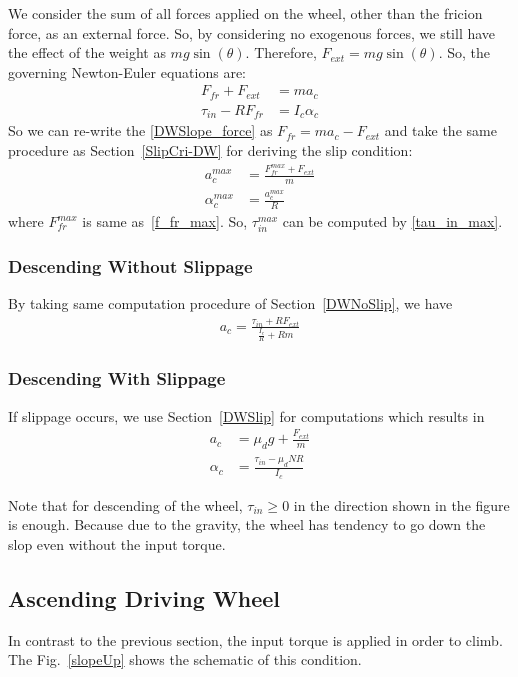 \documentclass[letterpaper, 10pt, conference]{ieeeconf}
\begin{document}
We consider the sum of all forces applied on the wheel, other than the fricion force, as an external force. So, by considering no exogenous forces, we still have the effect of the weight as $mg\sin(\theta)$. Therefore, $F_{ext} = mg\sin(\theta)$. So, the governing Newton-Euler equations are:
\begin{align}
F_{fr} + F_{ext} &= ma_c \label{DWSlope_force} \\
\tau_{in} - RF_{fr} &= I_c \alpha_c \label{DWSlope_torque}
\end{align}
So we can re-write the \eqref{DWSlope_force} as $F_{fr} = ma_c - F_{ext}$ and take the same procedure as Section~\ref{SlipCri-DW} for deriving the slip condition:
\begin{align}
a_c^{max} &= \frac{F_{fr}^{max} + F_{ext}}{m} \\
\alpha_c^{max} &= \frac{a_c^{max}}{R}
\end{align}
where $F_{fr}^{max}$ is same as~\eqref{f_fr_max}. So, $\tau_{in}^{max}$ can be computed by \eqref{tau_in_max}.
\subsubsection{Descending Without Slippage}
By taking same computation procedure of Section~\ref{DWNoSlip}, we have
\begin{align}
a_c = \frac{\tau_{in} + R F_{ext}}{\frac{I_c}{R} + Rm}
\end{align}

\subsubsection{Descending With Slippage}
If slippage occurs, we use Section~\ref{DWSlip} for computations which results in
\begin{align}
a_c &= \mu_dg + \frac{F_{ext}}{m} \\
\alpha_c &= \frac{\tau_{in} - \mu_d N R}{I_c}
\end{align}

Note that for descending of the wheel, $\tau_{in} \geqslant 0$ in the direction shown in the figure is enough. Because due to the gravity, the wheel has tendency to go down the slop even without the input torque.
\subsection{Ascending Driving Wheel}
In contrast to the previous section, the input torque is applied in order to climb. The Fig.~\ref{slopeUp} shows the schematic of this condition.
\end{document}
